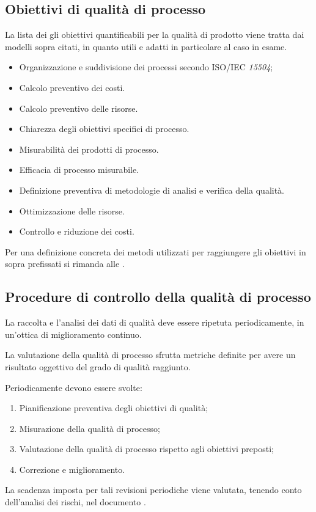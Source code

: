 \documentclass[12pt,a4paper]{article}
\begin{document}
\subsection{Obiettivi di qualità di processo}
La lista dei gli obiettivi quantificabili per la qualità di prodotto viene tratta dai modelli sopra citati, in quanto utili e adatti in particolare al caso in esame.
\begin{itemize}
	\item Organizzazione e suddivisione dei processi secondo ISO/IEC \textit{15504};
	\item Calcolo preventivo dei costi.
	\item Calcolo preventivo delle risorse.
	\item Chiarezza degli obiettivi specifici di processo.
	\item Misurabilità dei prodotti di processo.
	\item Efficacia di processo misurabile.
	\item Definizione preventiva di metodologie di analisi e verifica della qualità.
	\item{Ottimizzazione delle risorse}.
	\item{Controllo e riduzione dei costi}.
\end{itemize}
Per una definizione concreta dei metodi utilizzati per raggiungere gli obiettivi in sopra prefissati si rimanda alle \NdP{}.


\subsection{Procedure di controllo della qualità di processo}
La raccolta e l'analisi dei dati di qualità deve essere ripetuta periodicamente, in un'ottica di miglioramento continuo. 

La valutazione della qualità di processo sfrutta metriche  definite per avere un risultato oggettivo del grado di qualità raggiunto.

Periodicamente devono essere svolte:
\begin{enumerate}
	\item Pianificazione preventiva degli obiettivi di qualità;
	\item Misurazione della qualità di processo;
	\item Valutazione della qualità di processo rispetto agli obiettivi preposti;
	\item Correzione e miglioramento.
\end{enumerate}
La scadenza imposta per tali revisioni periodiche viene valutata, tenendo  conto dell'analisi dei rischi, nel documento \PdP{}.
\end{document}
